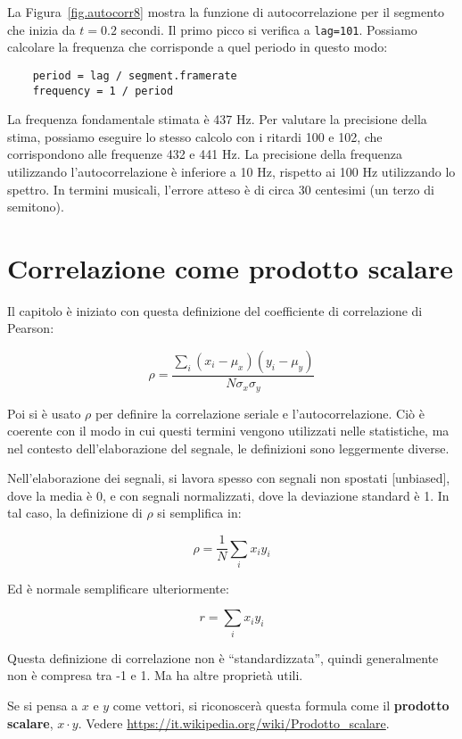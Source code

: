 \documentclass[12pt]{book} \usepackage[width=5.5in,height=8.5in, hmarginratio=3:2,vmarginratio=1:1]{geometry}
\begin{document}
La Figura~\ref{fig.autocorr8} mostra la funzione di autocorrelazione per il segmento che inizia da $t=0.2$ secondi. Il primo picco si verifica a {\tt lag=101}. Possiamo calcolare la frequenza che corrisponde a quel periodo in questo modo:

\begin{verbatim} 
    period = lag / segment.framerate
    frequency = 1 / period
 \end{verbatim} 

La frequenza fondamentale stimata è 437 Hz. Per valutare la precisione della stima, possiamo eseguire lo stesso calcolo con i ritardi 100 e 102, che corrispondono alle frequenze 432 e 441 Hz. La precisione della frequenza utilizzando l'autocorrelazione è inferiore a 10 Hz, rispetto ai 100 Hz utilizzando lo spettro. In termini musicali, l'errore atteso è di circa 30 centesimi (un terzo di semitono).

\section{Correlazione come prodotto scalare} \label{dotproduct} 

Il capitolo è iniziato con questa definizione del coefficiente di correlazione di Pearson:

%
\[ \rho = \frac{ \sum_i (x_i - \mu_x) (y_i - \mu_y)}{N \sigma_x \sigma_y} \] 

%
Poi si è usato $\rho$ per definire la correlazione seriale e l'autocorrelazione. Ciò è coerente con il modo in cui questi termini vengono utilizzati nelle statistiche, ma nel contesto dell'elaborazione del segnale, le definizioni sono leggermente diverse.

Nell'elaborazione dei segnali, si lavora spesso con segnali non spostati [unbiased], dove la media è 0, e con segnali normalizzati, dove la deviazione standard è 1. In tal caso, la definizione di $\rho$ si semplifica in:

%
\[ \rho = \frac{1}{N} \sum_i x_i y_i \] 

%
Ed è normale semplificare ulteriormente:

%
\[ r = \sum_i x_i y_i \] 

%
Questa definizione di correlazione non è ``standardizzata'', quindi generalmente non è compresa tra -1 e 1. Ma ha altre proprietà utili.

Se si pensa a $x$ e $y$ come vettori, si riconoscerà questa formula come il {\bf prodotto scalare}, $x \cdot y$. Vedere \url{https://it.wikipedia.org/wiki/Prodotto_scalare}.
\end{document}
